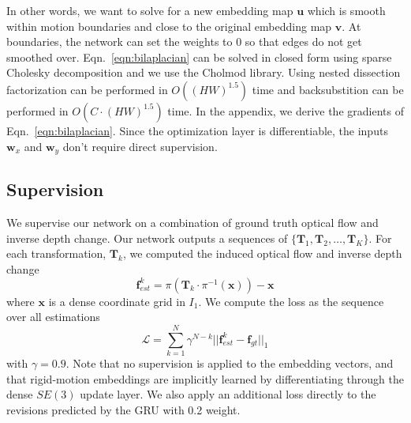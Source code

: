 \documentclass[final]{cvpr}
\begin{document}
In other words, we want to solve for a new embedding map $\mathbf{u}$ which is smooth within motion boundaries and close to the original embedding map $\mathbf{v}$. At boundaries, the network can set the weights to 0 so that edges do not get smoothed over. Eqn.~\ref{eqn:bilaplacian} can be solved in closed form using sparse Cholesky decomposition and we use the Cholmod library\cite{chen2008algorithm}. Using nested dissection\cite{george1973nested} factorization can be performed in $O({(HW)}^{1.5})$ time and backsubstition can be performed in $O({C\cdot(HW)}^{1.5})$ time. In the appendix, we derive the gradients of Eqn.~\ref{eqn:bilaplacian}. Since the optimization layer is differentiable, the inputs $\mathbf{w}_x$ and $\mathbf{w}_y$ don't require direct supervision.


\subsection{Supervision}
We supervise our network on a combination of ground truth optical flow and inverse depth change. Our network outputs a sequences of $\{\mathbf{T}_1, \mathbf{T}_2, \hdots,  \mathbf{T}_K \}$. For each transformation, $\mathbf{T}_k$, we computed the induced optical flow and inverse depth change
\begin{equation}
    \mathbf{f}_{est}^k = \pi(\mathbf{T}_k \cdot \pi^{-1}(\mathbf{x})) - \mathbf{x}
\end{equation}
where $\mathbf{x}$ is a dense coordinate grid in $I_1$. We compute the loss as the sequence over all estimations
\begin{equation}
    \mathcal{L} = \sum_{k=1}^N \gamma^{N-k}||\mathbf{f}_{est}^k - \mathbf{f}_{gt} {||}_1
\end{equation}
with $\gamma=0.9$. Note that no supervision is applied to the embedding vectors, and that rigid-motion embeddings are implicitly learned by differentiating through the dense $SE(3)$ update layer. We also apply an additional loss directly to the revisions predicted by the GRU with 0.2 weight.
\end{document}
